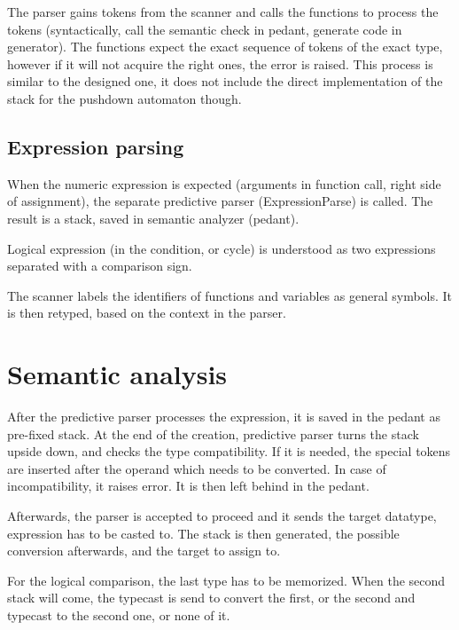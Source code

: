 \documentclass[10pt,a4paper,titlepage]{article}
\begin{document}
\begin{justify}
The parser gains tokens from the scanner and calls the functions to process
the tokens (syntactically, call the semantic check in pedant, generate code
in generator). The functions expect the exact sequence of tokens of the exact
type, however if it will not acquire the right ones, the error is raised. This
process is similar to the designed one, it does not include the direct
implementation of the stack for the pushdown automaton though.
\end{justify}

\subsection {Expression parsing}
\begin{justify}
When the numeric expression is expected (arguments in function call, right
side of assignment), the separate predictive parser (ExpressionParse) is
called. The result is a stack, saved in semantic analyzer (pedant).

Logical expression (in the condition, or cycle) is understood as two
expressions separated with a comparison sign.

The scanner labels the identifiers of functions and variables as general
symbols. It is then retyped, based on the context in the parser.
\end{justify}

\section{Semantic analysis}
\begin{justify}
After the predictive parser processes the expression, it is saved in the
pedant as pre-fixed stack. At the end of the creation, predictive parser turns
the stack upside down, and checks the type compatibility. If it is needed,
the special tokens are inserted after the operand which needs to be converted.
In case of incompatibility, it raises error. It is then left behind in the
pedant.

Afterwards, the parser is accepted to proceed and it sends the target datatype,
expression has to be casted to. The stack is then generated, the possible
conversion afterwards, and the target to assign to.

For the logical comparison, the last type has to be memorized. When the
second stack will come, the typecast is send to convert the first, or the
second and typecast to the second one, or none of it.
\end{justify}
\end{document}
